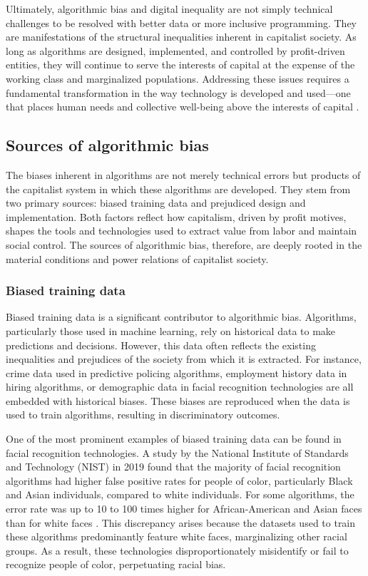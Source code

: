 Ultimately, algorithmic bias and digital inequality are not simply technical challenges to be resolved with better data or more inclusive programming. They are manifestations of the structural inequalities inherent in capitalist society. As long as algorithms are designed, implemented, and controlled by profit-driven entities, they will continue to serve the interests of capital at the expense of the working class and marginalized populations. Addressing these issues requires a fundamental transformation in the way technology is developed and used—one that places human needs and collective well-being above the interests of capital \cite[pp.~12-14]{birhane2021}.

\subsection{Sources of algorithmic bias}

The biases inherent in algorithms are not merely technical errors but products of the capitalist system in which these algorithms are developed. They stem from two primary sources: biased training data and prejudiced design and implementation. Both factors reflect how capitalism, driven by profit motives, shapes the tools and technologies used to extract value from labor and maintain social control. The sources of algorithmic bias, therefore, are deeply rooted in the material conditions and power relations of capitalist society.

\subsubsection{Biased training data}

Biased training data is a significant contributor to algorithmic bias. Algorithms, particularly those used in machine learning, rely on historical data to make predictions and decisions. However, this data often reflects the existing inequalities and prejudices of the society from which it is extracted. For instance, crime data used in predictive policing algorithms, employment history data in hiring algorithms, or demographic data in facial recognition technologies are all embedded with historical biases. These biases are reproduced when the data is used to train algorithms, resulting in discriminatory outcomes.

One of the most prominent examples of biased training data can be found in facial recognition technologies. A study by the National Institute of Standards and Technology (NIST) in 2019 found that the majority of facial recognition algorithms had higher false positive rates for people of color, particularly Black and Asian individuals, compared to white individuals. For some algorithms, the error rate was up to 10 to 100 times higher for African-American and Asian faces than for white faces \cite[pp.~38-40]{grother2019}. This discrepancy arises because the datasets used to train these algorithms predominantly feature white faces, marginalizing other racial groups. As a result, these technologies disproportionately misidentify or fail to recognize people of color, perpetuating racial bias.

